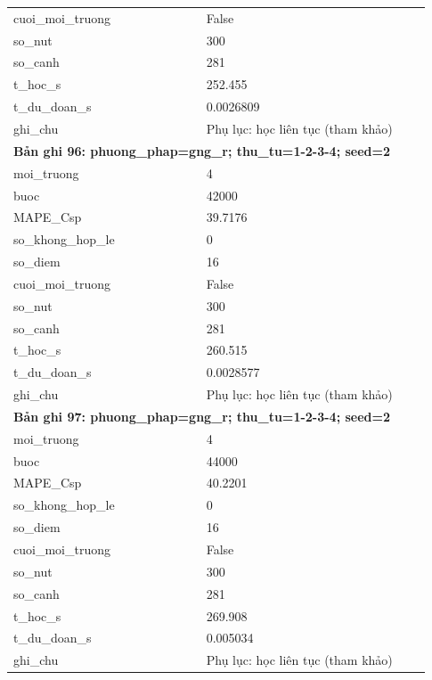 \begin{longtable}{p{0.43\linewidth}p{0.50\linewidth}}
cuoi\_\allowbreak moi\_\allowbreak truong & False \\
so\_\allowbreak nut & 300 \\
so\_\allowbreak canh & 281 \\
t\_\allowbreak hoc\_\allowbreak s & 252.455 \\
t\_\allowbreak du\_\allowbreak doan\_\allowbreak s & 0.0026809 \\
ghi\_\allowbreak chu & Phụ lục: học liên tục (tham khảo) \\
\midrule
\multicolumn{2}{p{0.95\linewidth}}{\textbf{Bản ghi 96: phuong\_phap=gng\_r; thu\_tu=1-2-3-4; seed=2}} \\
moi\_\allowbreak truong & 4 \\
buoc & 42000 \\
MAPE\_\allowbreak Csp & 39.7176 \\
so\_\allowbreak khong\_\allowbreak hop\_\allowbreak le & 0 \\
so\_\allowbreak diem & 16 \\
cuoi\_\allowbreak moi\_\allowbreak truong & False \\
so\_\allowbreak nut & 300 \\
so\_\allowbreak canh & 281 \\
t\_\allowbreak hoc\_\allowbreak s & 260.515 \\
t\_\allowbreak du\_\allowbreak doan\_\allowbreak s & 0.0028577 \\
ghi\_\allowbreak chu & Phụ lục: học liên tục (tham khảo) \\
\midrule
\multicolumn{2}{p{0.95\linewidth}}{\textbf{Bản ghi 97: phuong\_phap=gng\_r; thu\_tu=1-2-3-4; seed=2}} \\
moi\_\allowbreak truong & 4 \\
buoc & 44000 \\
MAPE\_\allowbreak Csp & 40.2201 \\
so\_\allowbreak khong\_\allowbreak hop\_\allowbreak le & 0 \\
so\_\allowbreak diem & 16 \\
cuoi\_\allowbreak moi\_\allowbreak truong & False \\
so\_\allowbreak nut & 300 \\
so\_\allowbreak canh & 281 \\
t\_\allowbreak hoc\_\allowbreak s & 269.908 \\
t\_\allowbreak du\_\allowbreak doan\_\allowbreak s & 0.005034 \\
ghi\_\allowbreak chu & Phụ lục: học liên tục (tham khảo) \\

\end{longtable}
